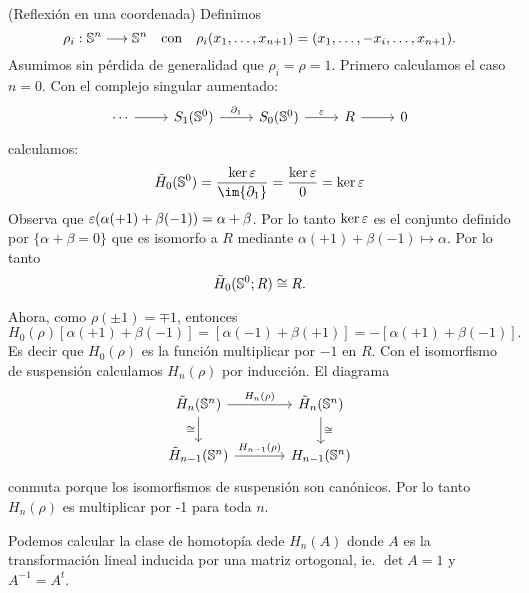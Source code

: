 \documentclass[../../topologia_algebraica]{subfiles}
\begin{document}
\begin{ejemplo}(Reflexi\'on en una coordenada) Definimos
  \[
    \rho_i:\mathbb{S}^n\longrightarrow\mathbb{S}^n \quad\text{con}\quad
    \rho_i(x_1,\ldots,x_{n+1})=(x_1,\ldots,-x_i,\ldots,x_{n+1}).
  \]
  Asumimos sin p\'erdida de generalidad que $\rho_i=\rho=1$. Primero calculamos el caso $n=0$.
  Con el complejo singular aumentado:
  \[
    \begin{tikzcd}
      \cdots \arrow[r] & S_1(\Sn^0) \arrow[r,"\partial_1"] &
      S_0(\Sn^0) \arrow[r,"\eps"] & R \arrow[r] & 0
    \end{tikzcd}
  \]
  calculamos:
  \[
    \tilde{H}_0(\Sn^0)=\frac{\ker\eps}{\im{\partial_1}}=\frac{\ker\eps}{0}=\ker\eps
  \]
  Observa que $\varepsilon(\alpha(+1)+\beta(-1))=\alpha+\beta$. Por lo tanto $\ker\varepsilon$ es
  el conjunto definido por $\{\alpha+\beta=0\}$ que es isomorfo a $R$ mediante
  $\alpha(+1)+\beta(-1)\mapsto \alpha$. Por lo tanto
  \[
    \tilde{H}_0(\mathbb{S}^0;R)\cong R.
  \]

  Ahora, como $\rho(\pm 1)=\mp 1$, entonces
  \[
    H_0(\rho)[\alpha(+1)+\beta(-1)]=[\alpha(-1)+\beta(+1)]=-[\alpha(+1)+\beta(-1)].
  \]
  Es decir que $H_0(\rho)$ es la funci\'on multiplicar por $-1$ en $R$. Con el isomorfismo
  de suspensi\'on calculamos $H_n(\rho)$ por inducci\'on. El diagrama
  \[
    \begin{tikzcd}[column sep=large]
      \tilde{H}_{n}(\Sn^{n}) \arrow[r,"H_n(\rho)"] \arrow[d,"\cong"'] &
      \tilde{H}_n(\Sn^n) \arrow[d,"\cong"] \\
      \tilde{H}_{n-1}(\Sn^n) \arrow[r,"H_{n-1}(\rho)"] & H_{n-1}(\Sn^n)
    \end{tikzcd}
  \]
  conmuta porque los isomorfismos de suspensi\'on son can\'onicos. Por lo tanto $H_n(\rho)$
  es multiplicar por -1 para toda $n$.
\end{ejemplo}

Podemos calcular la clase de homotop\'ia dede $H_n(A)$ donde $A$ es la transformaci\'on lineal
inducida por una matriz ortogonal, ie. $\det A=1$ y $A^{-1}=A^t$.
\end{document}

